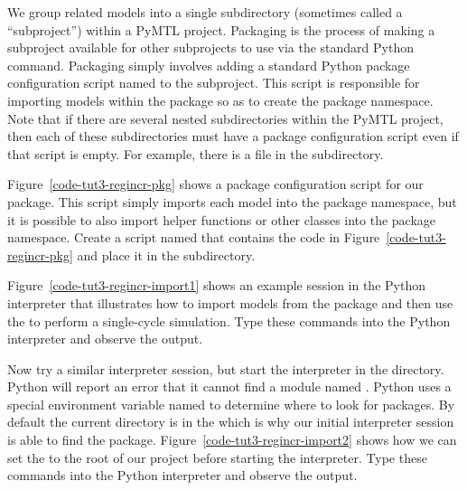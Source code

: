 \documentclass{cbxdoc}
\begin{document}
We group related models into a single subdirectory (sometimes called a
``subproject'') within a PyMTL project. Packaging is the process of
making a subproject available for other subprojects to use via the
standard Python  command. Packaging simply involves adding a
standard Python package configuration script named  to
the subproject. This script is responsible for importing models within
the package so as to create the package namespace. Note that if there are
several nested subdirectories within the PyMTL project, then each of
these subdirectories must have a package configuration script even if
that script is empty. For example, there is a  file in
the  subdirectory.



Figure~\ref{code-tut3-regincr-pkg} shows a package configuration script
for our  package. This script simply imports each model into
the package namespace, but it is possible to also import helper functions
or other classes into the package namespace. Create a script named
 that contains the code in
Figure~\ref{code-tut3-regincr-pkg} and place it in the
 subdirectory.

\begin{figure}
\hfill
\begin{minipage}[t]{0.42\tw}
  
\end{minipage}
\hfill
\begin{minipage}[t]{0.42\tw}
  
\end{minipage}
\hfill\mbox{}
\end{figure}

Figure~\ref{code-tut3-regincr-import1} shows an example session in the
Python interpreter that illustrates how to import models from the
 package and then use the  to perform a
single-cycle simulation. Type these commands into the Python interpreter
and observe the output.

Now try a similar interpreter session, but start the interpreter in the
 directory. Python will report an error that it cannot find a
module named . Python uses a special environment
variable named  to determine where to look for packages.
By default the current directory is in the  which is why
our initial interpreter session is able to find the  package.
Figure~\ref{code-tut3-regincr-import2} shows how we can set the
 to the root of our project before starting the
interpreter. Type these commands into the Python interpreter and observe
the output.
\end{document}
